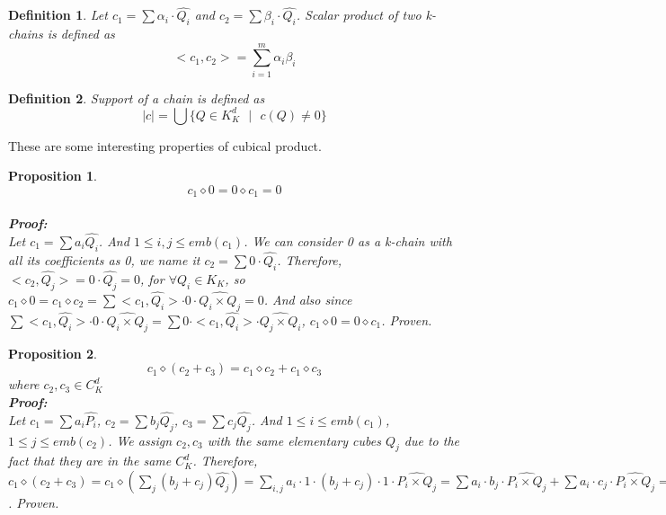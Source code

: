 \documentclass[12pt,letterpaper]{article}
\newtheorem{mydef}{Definition}
\newtheorem{prop}{Proposition}
\begin{document}
\begin{normalsize}
\begin{mydef}\label{def:def444} 
Let $c_1=\sum \alpha_i \cdot \widehat{Q_i}$ and $c_2=\sum \beta_i \cdot \widehat{Q_i}$. Scalar product of two k-chains is defined as
$$<c_1,c_2>=\sum_{i=1}^m\alpha_i \beta_i$$
\end{mydef}

\begin{mydef}\label{def:def444} 
Support of a chain is defined as
$$|c|=\bigcup \{ Q \in K_K^d\mbox{ } | \mbox{ }c(Q) \neq 0\}$$
\end{mydef} 

These are some interesting properties of cubical product. 
\begin{prop}
$$c_1 \diamond 0 = 0 \diamond c_1 = 0$$ 
\\[20pt]
\newpage
\textbf{Proof:} \\
Let $c_1=\sum a_i \widehat{Q_i}$. And $1 \le i,j \le emb(c_1)$. We can consider 0 as a k-chain with all its coefficients as 0, we name it $c_2=\sum 0 \cdot \widehat{Q_i}$. Therefore, $<c_2,\widehat{Q_j}>= 0 \cdot \widehat{Q_j}=0$, for $\forall Q_i \in K_K$, so $c_1 \diamond 0=c_1 \diamond c_2= \sum <c_1, \widehat{Q_i}> \cdot 0 \cdot \widehat{Q_i \times Q_j}=0$. And also since $ \sum <c_1, \widehat{Q_i}> \cdot 0 \cdot \widehat{Q_i \times Q_j}=  \sum 0 \cdot <c_1, \widehat{Q_i}>  \cdot \widehat{Q_j \times Q_i}$, $c_1 \diamond 0= 0 \diamond c_1$. Proven.
\\[20pt]
\end{prop}

\begin{prop}
$$c_1 \diamond (c_2 +c_3) = c_1 \diamond c_2 + c_1 \diamond c_3$$
 where $c_2,c_3 \in C_K^d$ \\[10pt]
\textbf{Proof:} \\
Let $c_1=\sum a_i \widehat{P_i}$, $c_2=\sum b_j \widehat{Q_j}$, $c_3=\sum c_j \widehat{Q_j}$. And $1 \le i \le emb(c_1)$, $1 \le j \le emb(c_2)$. We assign $c_2,c_3$ with the same elementary cubes $Q_j$ due to the fact that they are in the same $C_K^d$. Therefore, $c_1 \diamond (c_2 + c_3)=c_1 \diamond (\sum_{j}(b_j+c_j)\widehat{Q_j})=\sum_{i,j} a_i \cdot 1 \cdot (b_j+c_j) \cdot 1 \cdot \widehat{P_i \times Q_j}= \sum a_i  \cdot b_j \cdot \widehat{P_i \times Q_j} +\sum a_i  \cdot c_j \cdot \widehat{P_i \times Q_j}=c_1 \diamond c_2 + c_1 \diamond c_3$. Proven.
\\[20pt]
\end{prop}


\end{normalsize}
\end{document}
